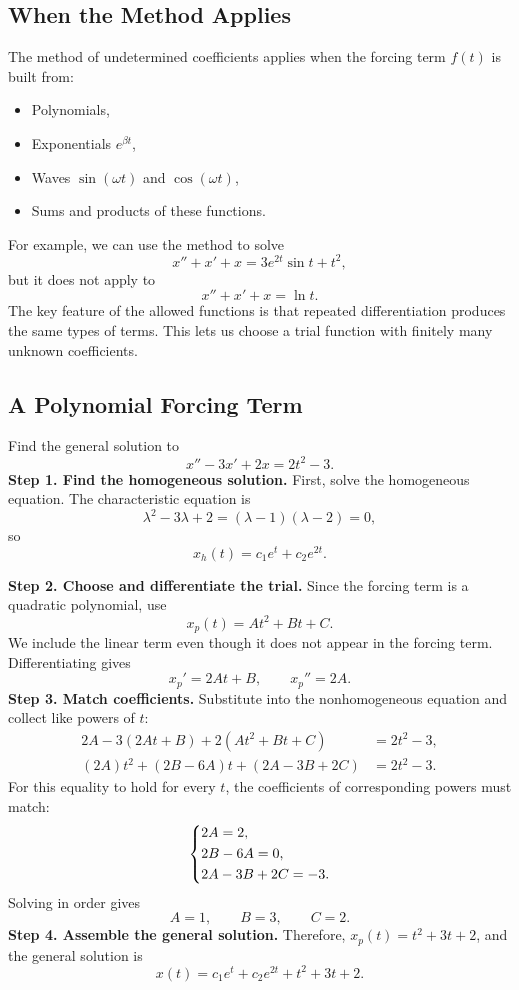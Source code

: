 \documentclass[10pt,letterpaper]{article}
\begin{document}
\subsection{When the Method Applies}

The method of undetermined coefficients applies when the forcing
term $f(t)$ is built from:
\begin{itemize}
    \item Polynomials,
    \item Exponentials $e^{\beta t}$,
    \item Waves $\sin(\omega t)$ and $\cos(\omega t)$,
    \item Sums and products of these functions.
\end{itemize}
For example, we can use the method to solve
\[
x''+x'+x=3e^{2t}\sin t+t^2,
\]
but it does not apply to
\[
x''+x'+x=\ln t.
\]
The key feature of the allowed functions is that repeated
differentiation produces the same types of terms. This lets
us choose a trial function with finitely many unknown coefficients.


\subsection{A Polynomial Forcing Term}
\begin{example}{
Find the general solution to
\[
x''-3x'+2x=2t^2-3.
\]
}
\textbf{Step 1. Find the homogeneous solution.}
First, solve the homogeneous equation. The characteristic equation is
\[
\lambda^2-3\lambda+2=(\lambda-1)(\lambda-2)=0,
\]
so
\[
x_h(t)=c_1e^t+c_2e^{2t}.
\]

\textbf{Step 2. Choose and differentiate the trial.}
Since the forcing term is a quadratic polynomial, use
\[
x_p(t)=At^2+Bt+C.
\]
We include the linear term even though it does not appear
in the forcing term. Differentiating gives
\[
x_p'=2At+B,
\qquad
x_p''=2A.
\]
\textbf{Step 3. Match coefficients.}
Substitute into the nonhomogeneous equation and collect
like powers of $t$:
\begin{align*}
2A-3(2At+B)+2(At^2+Bt+C)&=2t^2-3,\\
(2A)t^2+(2B-6A)t+(2A-3B+2C)&=2t^2-3.
\end{align*}
For this equality to hold for every $t$, the coefficients
of corresponding powers must match:
\[
\begin{dcases}
2A=2,\\
2B-6A=0,\\
2A-3B+2C=-3.
\end{dcases}
\]
Solving in order gives
\[
A=1,\qquad B=3,\qquad C=2.
\]
\textbf{Step 4. Assemble the general solution.}
Therefore, $x_p(t)=t^2+3t+2$, and the general solution is
\[
\boxed{x(t)=c_1e^t+c_2e^{2t}+t^2+3t+2.}
\]
\end{example}
\end{document}
